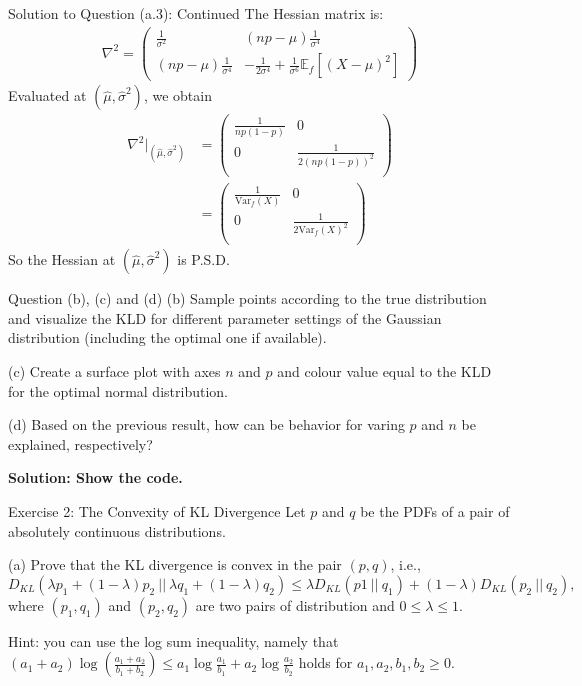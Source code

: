 \documentclass[aspectratio=169]{beamer}
\newcommand{\kld}[1]{D_{KL}\left(#1\right)}
\newcommand{\Ef}{\mathbb{E}_f}
\newcommand{\Varf}{\mathrm{Var}_f}
\begin{document}
\begin{frame}{Solution to Question (a.3): Continued}
	The Hessian matrix is:
	\begin{align*}
		\nabla^2 = \begin{pmatrix}
			\frac{1}{\sigma^2} & (np -\mu) \frac{1}{\sigma^4} \\
			(np -\mu) \frac{1}{\sigma^4} & - \frac{1}{2\sigma^4} + \frac{1}{\sigma^6} \Ef [(X -\mu)^2]
		\end{pmatrix}
	\end{align*}
	Evaluated at $(\hat{\mu}, \hat{\sigma}^2)$, we obtain
	\begin{align*}
		\nabla^2 \bigg|_{(\hat{\mu}, \hat{\sigma}^2)} 
		&= \begin{pmatrix}
			\frac{1}{np(1-p)} & 0 \\
			0 & \frac{1}{2 (np(1-p))^2} \\
			\end{pmatrix} \\
		&= \begin{pmatrix}
			\frac{1}{\Varf(X)} & 0 \\
			0 & \frac{1}{2 \Varf(X)^2} \\
		\end{pmatrix}
	\end{align*}
	So the Hessian at $(\hat{\mu}, \hat{\sigma}^2)$ is P.S.D.
\end{frame}

\begin{frame}{Question (b), (c) and (d)}
	(b) Sample points according to the true distribution and visualize the KLD for different parameter settings of the Gaussian distribution (including the optimal one if available).
	
	\vspace{20pt}
	(c) Create a surface plot with axes $n$ and $p$ and colour value equal to the KLD for the optimal normal distribution.
	
	\vspace{20pt}
	(d) Based on the previous result, how can be behavior for varing $p$ and $n$ be explained, respectively?
	
	\vspace{20pt}
	\textbf{Solution: Show the code.}
\end{frame}


\begin{frame}{Exercise 2: The Convexity of KL Divergence}
	Let $p$ and $q$ be the PDFs of a pair of absolutely continuous distributions. 
	
	(a) Prove that the KL divergence is convex in the pair $(p, q)$, i.e., 
	$$\kld{\lambda p_1 + (1 - \lambda) p_2 \ || \ \lambda q_1 + (1-\lambda) q_2} \leq \lambda \kld{p1 \ || \ q_1} + (1 - \lambda) \kld{p_2 \ || \ q_2},$$
	where $(p_1, q_1)$ and $(p_2, q_2)$ are two pairs of distribution and $0 \leq \lambda \leq 1$.
	
	\vspace{20pt}
	Hint: you can use the log sum inequality, namely that $(a_1 + a_2) \log \left( \frac{a_1 + a_2}{b_1 + b_2} \right) \leq a_1 \log \frac{a_1}{b_1} + a_2 \log \frac{a_2}{b_2}$ holds for $a_1, a_2, b_1, b_2 \geq 0$.
\end{frame}
\end{document}
